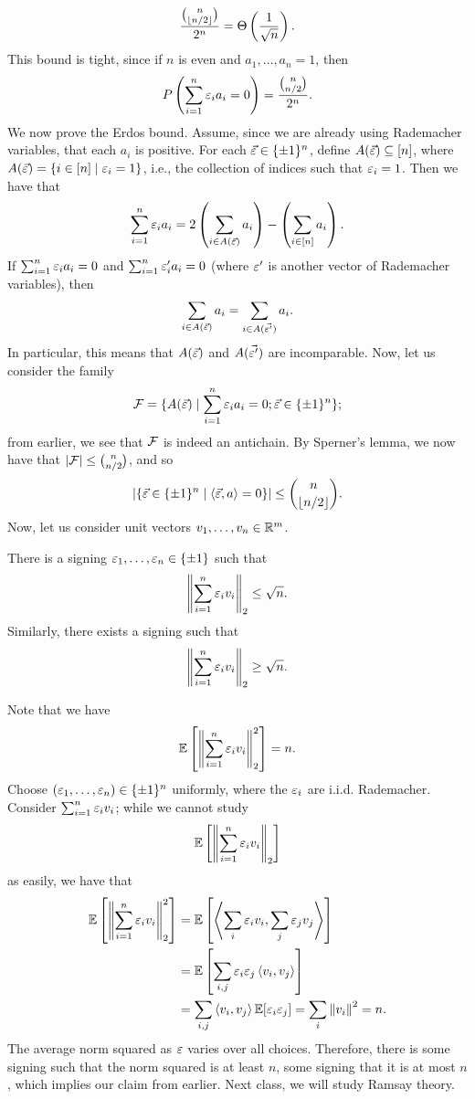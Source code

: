\[ \frac{\binom{n}{\left\lfloor n/2 \right\rfloor}}{2^n} = \Theta\left(\frac{1}{\sqrt{n}}\right). \]
This bound is tight, since if $n$ is even and $a_1, \dots, a_n = 1$, then
\[ P\left(\sum_{i=1}^n \varepsilon_i a_i = 0\right) = \frac{\binom{n}{n/2}}{2^n}. \]
We now prove the Erdos bound. Assume, since we are already using Rademacher variables, that each $a_i$ is positive. For each $\vec{\varepsilon} \in \{\pm 1\}^n$, define $A(\vec{\varepsilon}) \subseteq [n]$, where $A(\vec{\varepsilon}) = \{i \in [n] \mid \varepsilon_i = 1\}$, i.e., the collection of indices such that $\varepsilon_i = 1$. Then we have that
\[ \sum_{i=1}^n \varepsilon_i a_i = 2 \left(\sum_{i \in A(\vec{\varepsilon})} a_i \right) - \left(\sum_{i \in [n]} a_i \right). \]
If $\sum_{i=1}^n \varepsilon_i a_i = 0$ and $\sum_{i=1}^n \varepsilon_i' a_i = 0$ (where $\varepsilon'$ is another vector of Rademacher variables), then
\[ \sum_{i \in A(\vec{\varepsilon})} a_i = \sum_{i \in A(\vec{\varepsilon'})} a_i. \]
In particular, this means that $A(\vec{\varepsilon})$ and $A(\vec{\varepsilon'})$ are incomparable. Now, let us consider the family
\[ \mathcal F = \{A(\vec{\varepsilon}) \mid \sum_{i=1}^n \varepsilon_i a_i = 0; \vec{\varepsilon} \in \{\pm 1\}^n\}; \]
from earlier, we see that $\mathcal F$ is indeed an antichain. By Sperner's lemma, we now have that $\left\lvert \mathcal F \right\rvert \leq \binom{n}{n/2}$, and so
\[ \left\lvert \{\vec{\varepsilon} \in \{\pm 1\}^n \mid \left< \vec{\varepsilon}, a \right> = 0 \} \right\rvert \leq \binom{n}{\left\lfloor n/2 \right\rfloor}. \]
Now, let us consider unit vectors $v_1, \dots, v_n \in \mathbb R^m$.
\begin{simpleclaim}
    There is a signing $\varepsilon_1, \dots, \varepsilon_n \in \{\pm 1\}$ such that
    \[ \left\lVert \sum_{i=1}^n \varepsilon_i v_i \right\rVert_2 \leq \sqrt{n}. \]
    Similarly, there exists a signing such that
    \[ \left\lVert \sum_{i=1}^n \varepsilon_i v_i \right\rVert_2 \geq \sqrt{n}. \]
\end{simpleclaim}
\noindent Note that we have
\[ \mathbb E \left[ \left\lVert \sum_{i=1}^n \varepsilon_i v_i \right\rVert_2^2 \right] = n. \]
Choose $(\varepsilon_1, \dots, \varepsilon_n) \in \{\pm 1\}^n$ uniformly, where the $\varepsilon_i$ are i.i.d. Rademacher. Consider $\sum_{i=1}^n \varepsilon_i v_i$; while we cannot study
\[ \mathbb E\left[ \left\lVert \sum_{i=1}^n \varepsilon_i v_i \right\rVert_2 \right] \]
as easily, we have that
\begin{align*}
    \mathbb E\left[ \left\lVert \sum_{i=1}^n \varepsilon_i v_i \right\rVert_2^2 \right] &= \mathbb E \left[\left< \sum_i \varepsilon_i v_i, \sum_j \varepsilon_j v_j \right>\right] \\
    &= \mathbb E\left[ \sum_{i,j} \varepsilon_i \varepsilon_j \left<v_i, v_j\right> \right] \\
    &= \sum_{i,j} \left<v_i, v_j\right> \mathbb E[\varepsilon_i \varepsilon_j] = \sum_i \left\lVert v_i \right\rVert^2 = n.
\end{align*}
The average norm squared as $\varepsilon$ varies over all choices. Therefore, there is some signing such that the norm squared is at least $n$, some signing that it is at most $n$, which implies our claim from earlier.
\medskip\newline
Next class, we will study Ramsay theory.